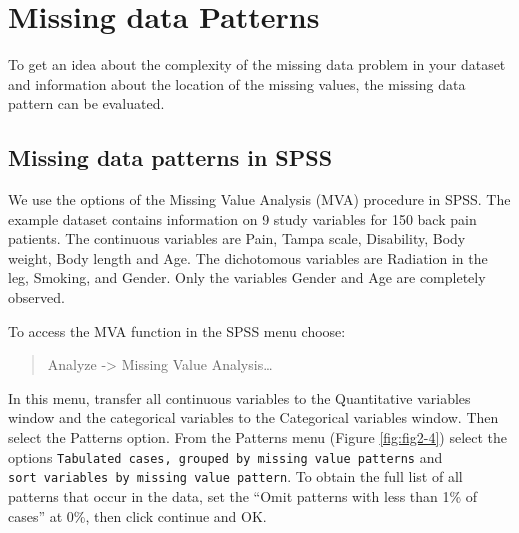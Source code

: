 \documentclass[
]{book}
\begin{document}
\hypertarget{missing-data-patterns}{%
\section{Missing data Patterns}\label{missing-data-patterns}}

To get an idea about the complexity of the missing data problem in your dataset and information about the location of the missing values, the missing data pattern can be evaluated.

\hypertarget{missing-data-patterns-in-spss}{%
\subsection{Missing data patterns in SPSS}\label{missing-data-patterns-in-spss}}

We use the options of the Missing Value Analysis (MVA) procedure in SPSS. The example dataset contains information on 9 study variables for 150 back pain patients. The continuous variables are Pain, Tampa scale, Disability, Body weight, Body length and Age. The dichotomous variables are Radiation in the leg, Smoking, and Gender. Only the variables Gender and Age are completely observed.

To access the MVA function in the SPSS menu choose:

\begin{quote}
Analyze -\textgreater{} Missing Value Analysis\ldots{}
\end{quote}

In this menu, transfer all continuous variables to the Quantitative variables window and the categorical variables to the Categorical variables window. Then select the Patterns option. From the Patterns menu (Figure \ref{fig:fig2-4}) select the options \texttt{Tabulated\ cases,\ grouped\ by\ missing\ value\ patterns} and \texttt{sort\ variables\ by\ missing\ value\ pattern}. To obtain the full list of all patterns that occur in the data, set the ``Omit patterns with less than 1\% of cases'' at 0\%, then click continue and OK.
\end{document}
